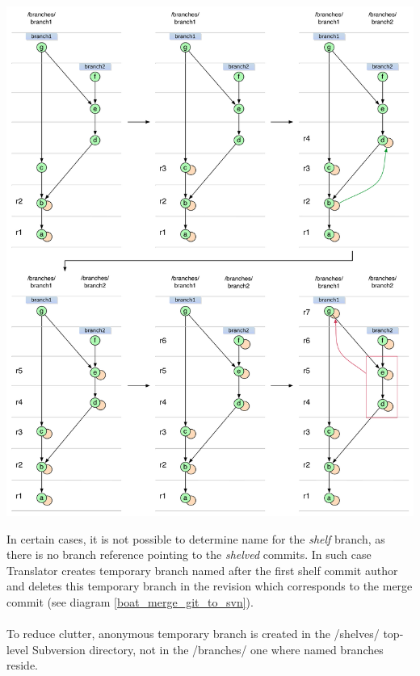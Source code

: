 \begin{center}
\includegraphics[width=\textwidth]{img/diagrams/boat_merge_shelve_is_normal_branch_git_to_svn.pdf}%
\label{boat_merge_shelve_is_normal_branch_git_to_svn}%
\end{center}

In certain cases, it is not possible to determine name for the \emph{shelf} branch, as there is no branch reference pointing to
the \emph{shelved} commits. In such case Translator creates temporary branch named after the first shelf commit author and 
deletes this temporary branch in the revision which corresponds to the merge commit (see diagram \ref{boat_merge_git_to_svn}). 
\\\\
To reduce clutter, anonymous temporary branch is created in the /shelves/ top-level Subversion directory, not in the /branches/ one where named branches reside. %


